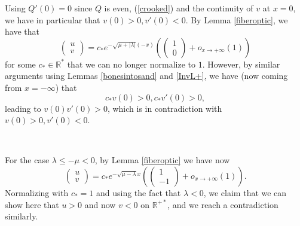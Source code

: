 \documentclass[11 pt]{amsart}
\theoremstyle{definition}
\theoremstyle{remark}
\numberwithin{equation}{section}
\begin{document}
Using $Q'(0)=0$ since $Q$ is even, (\ref{crooked}) and the continuity of $v$ at $x=0$, we have in particular that $v
(0) > 0, v' (0) < 0$.
By Lemma \ref{fiberoptic}, we have that
\[ \left(\begin{array}{c}
     u\\
     v
   \end{array}\right) = c_{\ast} e^{-\sqrt{\mu + | \lambda |} (- x)  }\left( \left(\begin{array}{c}
       1\\
       0
     \end{array}\right) + o_{x \rightarrow + \infty} (1) \right) \]
for some $c_{\ast} \in \mathbb{R}^{\ast}$ that we can no longer normalize to $1$. However, by similar arguments using Lemmas \ref{bonesintosand} and \ref{InvL+}, we have (now
coming from $x = - \infty$) that
\[ c_{\ast} v (0) > 0, c_{\ast} v' (0) > 0, \]
leading to $v (0) v' (0) > 0$, which is in contradiction with $v (0) > 0, v'
(0) < 0$.

\

For the case $\lambda \leqslant - \mu < 0$, by Lemma \ref{fiberoptic} we have now
\[ \left(\begin{array}{c}
     u\\
     v
   \end{array}\right) = c_{\ast} e^{-\sqrt{ \mu  - 
   \lambda } x } \left( \left(\begin{array}{c}
       1\\
       -1
     \end{array}\right) + o_{x \rightarrow + \infty} (1) \right). \]
Normalizing with $c_\ast = 1$
and using the fact that $\lambda < 0$, we claim that we can show here that $u > 0$ and now $v < 0$ on $\mathbb{R}^{+ \ast}$, and we reach a contradiction similarly.






\end{document}
